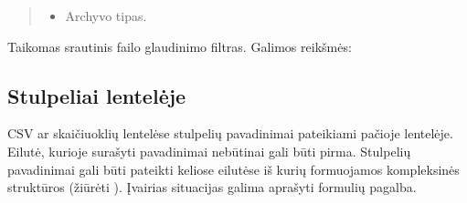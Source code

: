 \documentclass[letterpaper,10pt,lithuanian]{sphinxmanual}
\begin{document}
\begin{fulllineitems}
\begin{fulllineitems}
\begin{quote}
\begin{description}
\begin{itemize}
\item {} 
\sphinxAtStartPar
{} \sphinxhyphen{}\sphinxhyphen{} Archyvo tipas.

\end{itemize}

\end{description}\end{quote}

\sphinxAtStartPar
Taikomas srautinis failo glaudinimo filtras. Galimos  reikšmės:


\begin{fulllineitems}

\pysigstartsignatures
{}
\pysigstopsignatures
\end{fulllineitems}



\begin{fulllineitems}

\pysigstartsignatures
{}
\pysigstopsignatures
\end{fulllineitems}



\begin{fulllineitems}

\pysigstartsignatures
{}
\pysigstopsignatures
\end{fulllineitems}


\end{fulllineitems}


\end{fulllineitems}



\subsection{Stulpeliai lentelėje}
\label{\detokenize{formules:stulpeliai-lenteleje}}\label{\detokenize{formules:id5}}
\sphinxAtStartPar
CSV ar skaičiuoklių lentelėse stulpelių pavadinimai pateikiami pačioje
lentelėje. Eilutė, kurioje surašyti pavadinimai nebūtinai gali būti pirma.
Stulpelių pavadinimai gali būti pateikti keliose eilutėse iš kurių formuojamos
kompleksinės struktūros (žiūrėti {\hyperref[\detokenize{formules:kompleksines-strukturos}]{}}). Įvairias
situacijas galima aprašyti formulių pagalba.
\end{document}
